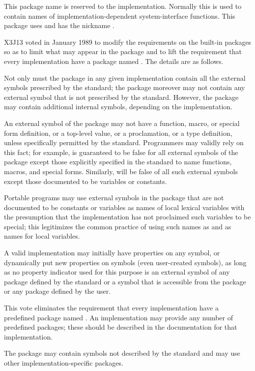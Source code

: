 \begin{obsolete}
\begin{flushdesc}
\item[\cd{system}]
This package name is reserved to the implementation.
Normally this is used to contain names of implementation-dependent
system-interface functions.  This package uses  and has the
nickname . 
\end{flushdesc}
\end{obsolete}

\begin{new}
X3J13 voted in January 1989
to modify the requirements on the built-in packages
so as to limit what may appear in the  package
and to lift the requirement that every implementation have a package
named .  The details are as follows.

Not only must the  package in any given implementation
contain all the external symbols prescribed by the standard;
the  package moreover may not contain any external symbol
that is not prescribed by the standard.  However, the 
package may contain additional internal symbols, depending on the
implementation.

An external symbol of the  package may not have a function,
macro, or special form definition, or a top-level value,
or a  proclamation, or a type definition, unless specifically
permitted by the standard.  Programmers may validly rely on this fact;
for example,  is guaranteed to be false for all
external symbols of the  package except those explicitly
specified in the standard to name functions, macros, and special forms.
Similarly,  will be false of all such external symbols
except those documented to be variables or constants.

Portable programs
may use external symbols in the  package that are not documented
to be constants or variables as names of local lexical
variables with the presumption that the implementation has not
proclaimed such variables to be special; this legitimizes the common
practice of using such names as  and  as names
for local variables.

A valid implementation may initially have properties on any symbol,
or dynamically put new properties on symbols (even user-created symbols),
as long as no property indicator used for this purpose is
an external symbol of any package defined by the standard
or a symbol that is accessible from the  package or any
package defined by the user.

This vote eliminates the requirement that every implementation have
a predefined package named .  An implementation may
provide any number of predefined packages; these should be described
in the documentation for that implementation.

The  package may contain symbols not described by the standard
and may use other implementation-specific packages.
\end{new}

